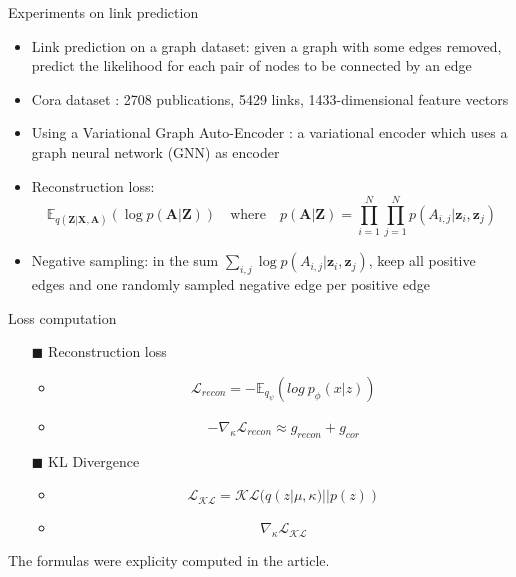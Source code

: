 \begin{frame}{Experiments on link prediction}

  \begin{itemize}
    \item Link prediction on a graph dataset: given a graph with some edges removed, predict the likelihood
    for each pair of nodes to be connected by an edge
    \item Cora dataset \cite{McCallum_2000}: 2708 publications, 5429 links, 1433-dimensional feature vectors
    \item Using a Variational Graph Auto-Encoder \cite{kipf_variational_2016}: a variational encoder which uses a
    graph neural network (GNN) as encoder
    \item Reconstruction loss:
        $$ \mathbb{E}_{q(\mathbf{Z}|\mathbf{X}, \mathbf{A})}(\log p(\mathbf{A}|\mathbf{Z})) \quad 
        \text{where} \quad p(\mathbf{A}|\mathbf{Z}) = \prod_{i = 1}^N \prod_{j=1}^N p(A_{i, j}|\mathbf{z}_i, \mathbf{z}_j) $$
    \item Negative sampling: in the sum $\sum_{i, j} \log p(A_{i, j}|\mathbf{z}_i, \mathbf{z}_j)$, keep all
    positive edges and one randomly sampled negative edge per positive edge
  \end{itemize}
\end{frame}


\begin{frame}{Loss computation}

  \begin{itemize}
    \item[$\blacksquare$] Reconstruction loss
      \begin{itemize}
        \item $$\mathcal{L}_{recon} =  - \mathbb{E}_{q_{\psi}}( log\ p_{\phi}(x | z)) $$
        \item$$ -\nabla_{\kappa} \mathcal{L}_{recon} \approx g_{recon} + g_{cor} $$ 
      \end{itemize}
    \item[$\blacksquare$] KL Divergence 
        \begin{itemize}
          \item $$ \mathcal{L}_{\mathcal{KL}} = \mathcal{KL}(q(z|\mu, \kappa) || p(z)) $$
          \item $$ \nabla_{\kappa} \mathcal{L}_{\mathcal{KL}} $$
        \end{itemize}
  \end{itemize}
  The formulas were explicity computed in the article.
  
\end{frame}

